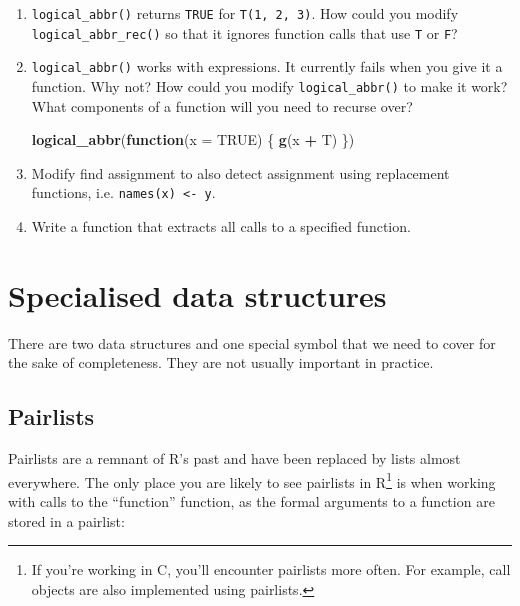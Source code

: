 \documentclass[]{book}
\newenvironment{Shaded}{\begin{snugshade}}{\end{snugshade}}
\newcommand{\ControlFlowTok}[1]{\textcolor[rgb]{0.27,0.27,0.27}{\textbf{#1}}}
\newcommand{\DataTypeTok}[1]{\textcolor[rgb]{0.27,0.27,0.27}{#1}}
\newcommand{\KeywordTok}[1]{\textcolor[rgb]{0.27,0.27,0.27}{\textbf{#1}}}
\newcommand{\NormalTok}[1]{#1}
\newcommand{\OperatorTok}[1]{\textcolor[rgb]{0.43,0.43,0.43}{\textbf{#1}}}
\newcommand{\OtherTok}[1]{\textcolor[rgb]{0.37,0.37,0.37}{#1}}
\newcommand{\StringTok}[1]{\textcolor[rgb]{0.5,0.5,0.5}{#1}}
\let\rmarkdownfootnote\footnote%
\def\footnote{\protect\rmarkdownfootnote}
\begin{document}
\begin{enumerate}
\def\labelenumi{\arabic{enumi}.}
\item
  \texttt{logical\_abbr()} returns \texttt{TRUE} for \texttt{T(1,\ 2,\ 3)}. How could you modify
  \texttt{logical\_abbr\_rec()} so that it ignores function calls that use \texttt{T} or \texttt{F}?
\item
  \texttt{logical\_abbr()} works with expressions. It currently fails when you give it
  a function. Why not? How could you modify \texttt{logical\_abbr()} to make it
  work? What components of a function will you need to recurse over?

\begin{Shaded}
\begin{Highlighting}[]
\KeywordTok{logical_abbr}\NormalTok{(}\ControlFlowTok{function}\NormalTok{(}\DataTypeTok{x =} \OtherTok{TRUE}\NormalTok{) \{}
  \KeywordTok{g}\NormalTok{(x }\OperatorTok{+}\StringTok{ }\NormalTok{T)}
\NormalTok{\})}
\end{Highlighting}
\end{Shaded}
\item
  Modify find assignment to also detect assignment using replacement
  functions, i.e. \texttt{names(x)\ \textless{}-\ y}.
\item
  Write a function that extracts all calls to a specified function.
\end{enumerate}

\hypertarget{expression-special}{%
\section{Specialised data structures}\label{expression-special}}

There are two data structures and one special symbol that we need to cover for the sake of completeness. They are not usually important in practice.

\hypertarget{pairlists}{%
\subsection{Pairlists}\label{pairlists}}


Pairlists are a remnant of R's past and have been replaced by lists almost everywhere. The only place you are likely to see pairlists in R\footnote{If you're working in C, you'll encounter pairlists more often. For example, call objects are also implemented using pairlists.} is when working with calls to the ``function'' function, as the formal arguments to a function are stored in a pairlist:
\end{document}

